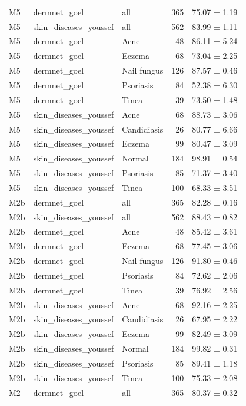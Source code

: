 \begin{tabular}{lllrl}
M5 & dermnet\_goel & all & 365 & 75.07 ± 1.19 \\
M5 & skin\_diseases\_youssef & all & 562 & 83.99 ± 1.11 \\
M5 & dermnet\_goel & Acne & 48 & 86.11 ± 5.24 \\
M5 & dermnet\_goel & Eczema & 68 & 73.04 ± 2.25 \\
M5 & dermnet\_goel & Nail fungus & 126 & 87.57 ± 0.46 \\
M5 & dermnet\_goel & Psoriasis & 84 & 52.38 ± 6.30 \\
M5 & dermnet\_goel & Tinea & 39 & 73.50 ± 1.48 \\
M5 & skin\_diseases\_youssef & Acne & 68 & 88.73 ± 3.06 \\
M5 & skin\_diseases\_youssef & Candidiasis & 26 & 80.77 ± 6.66 \\
M5 & skin\_diseases\_youssef & Eczema & 99 & 80.47 ± 3.09 \\
M5 & skin\_diseases\_youssef & Normal & 184 & 98.91 ± 0.54 \\
M5 & skin\_diseases\_youssef & Psoriasis & 85 & 71.37 ± 3.40 \\
M5 & skin\_diseases\_youssef & Tinea & 100 & 68.33 ± 3.51 \\
M2b & dermnet\_goel & all & 365 & 82.28 ± 0.16 \\
M2b & skin\_diseases\_youssef & all & 562 & 88.43 ± 0.82 \\
M2b & dermnet\_goel & Acne & 48 & 85.42 ± 3.61 \\
M2b & dermnet\_goel & Eczema & 68 & 77.45 ± 3.06 \\
M2b & dermnet\_goel & Nail fungus & 126 & 91.80 ± 0.46 \\
M2b & dermnet\_goel & Psoriasis & 84 & 72.62 ± 2.06 \\
M2b & dermnet\_goel & Tinea & 39 & 76.92 ± 2.56 \\
M2b & skin\_diseases\_youssef & Acne & 68 & 92.16 ± 2.25 \\
M2b & skin\_diseases\_youssef & Candidiasis & 26 & 67.95 ± 2.22 \\
M2b & skin\_diseases\_youssef & Eczema & 99 & 82.49 ± 3.09 \\
M2b & skin\_diseases\_youssef & Normal & 184 & 99.82 ± 0.31 \\
M2b & skin\_diseases\_youssef & Psoriasis & 85 & 89.41 ± 1.18 \\
M2b & skin\_diseases\_youssef & Tinea & 100 & 75.33 ± 2.08 \\
M2 & dermnet\_goel & all & 365 & 80.37 ± 0.32 \\

\end{tabular}
